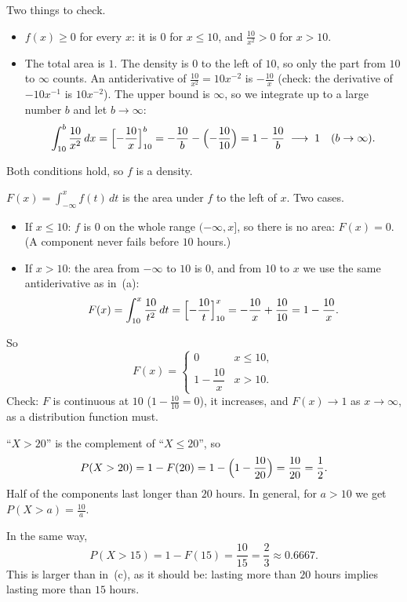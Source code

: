 \begin{solution}
	 Two things to check.
	\begin{itemize}
		\item $f(x)\ge0$ for every $x$: it is $0$ for $x\le10$, and
		      $\frac{10}{x^2}>0$ for $x>10$.
		\item The total area is $1$. The density is $0$ to the left of $10$,
		      so only the part from $10$ to $\infty$ counts. An antiderivative
		      of $\frac{10}{x^2}=10x^{-2}$ is $-\frac{10}{x}$
		      (check: the derivative of $-10x^{-1}$ is $10x^{-2}$). The upper
		      bound is $\infty$, so we integrate up to a large number $b$ and
		      let $b\to\infty$:
		      \[
			      \int_{10}^{b}\frac{10}{x^2}\,dx
			      =\Bigl[-\frac{10}{x}\Bigr]_{10}^{b}
			      =-\frac{10}{b}-\Bigl(-\frac{10}{10}\Bigr)
			      =1-\frac{10}{b}
			      \;\longrightarrow\; 1 \quad (b\to\infty).
		      \]
	\end{itemize}
	Both conditions hold, so $f$ is a density.

	 $F(x)=\int_{-\infty}^{x}f(t)\,dt$ is the area under $f$ to the
	left of $x$. Two cases.
	\begin{itemize}
		\item If $x\le10$: $f$ is $0$ on the whole range $(-\infty,x]$, so
		      there is no area: $F(x)=0$. (A component never fails before
		      $10$ hours.)
		\item If $x>10$: the area from $-\infty$ to $10$ is $0$, and from $10$
		      to $x$ we use the same antiderivative as in~(a):
		      \[
			      F(x)=\int_{10}^{x}\frac{10}{t^2}\,dt
			      =\Bigl[-\frac{10}{t}\Bigr]_{10}^{x}
			      =-\frac{10}{x}+\frac{10}{10}
			      =1-\frac{10}{x}.
		      \]
	\end{itemize}
	So
	\[
		F(x)=\begin{cases}
			0                  & x\le 10, \\[4pt]
			1-\dfrac{10}{x}    & x>10.
		\end{cases}
	\]
	Check: $F$ is continuous at $10$ ($1-\frac{10}{10}=0$), it increases, and
	$F(x)\to1$ as $x\to\infty$, as a distribution function must.

	 ``$X>20$'' is the complement of ``$X\le20$'', so
	\[
		P(X>20)=1-F(20)=1-\Bigl(1-\frac{10}{20}\Bigr)=\frac{10}{20}=\frac12.
	\]
	Half of the components last longer than $20$ hours. In general, for
	$a>10$ we get $P(X>a)=\frac{10}{a}$.

	 In the same way,
	\[
		P(X>15)=1-F(15)=\frac{10}{15}=\frac23\approx0.6667.
	\]
	This is larger than in~(c), as it should be: lasting more than $20$
	hours implies lasting more than $15$ hours.


\end{solution}
